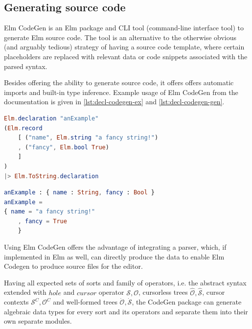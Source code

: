 \documentclass[sigplan,review]{acmart}
\begin{document}
\subsection{Generating source code}
Elm CodeGen\cite{elm-codegen-package} is an Elm package and
CLI tool (command-line interface tool) to generate Elm source code.
The tool is an alternative to the otherwise obvious (and arguably tedious)
strategy of having a source code template, where certain placeholders are
replaced with relevant data or code snippets associated with the parsed syntax.

Besides offering the ability to generate source code, it offers offers automatic
imports and built-in type inference. Example usage of Elm CodeGen from
the documentation\cite{elm-codegen-package} is given in \cref{lst:decl-codegen-ex} and \cref{lst:decl-codegen-gen}.

\begin{lstlisting}[language=elm,caption={An Elm CodeGen declaration passed to the ToString function},label={lst:decl-codegen-ex}]
Elm.declaration "anExample"
(Elm.record
    [ ("name", Elm.string "a fancy string!")
    , ("fancy", Elm.bool True)
    ]
)
|> Elm.ToString.declaration
\end{lstlisting}

\begin{lstlisting}[language=elm,caption={Result after running code generation via the Elm-CodeGen CLI},label={lst:decl-codegen-gen}]
anExample : { name : String, fancy : Bool }
anExample =
{ name = "a fancy string!"
    , fancy = True
    }
\end{lstlisting}

Using Elm CodeGen offers the advantage of integrating a parser, which,
if implemented in Elm as well, can directly produce the data to enable
Elm Codegen to produce source files for the editor.

Having all expected sets of sorts and family of operators,
i.e. the abstract syntax extended with $hole$ and $cursor$ operator $\mathcal{S},
  \mathcal{O}$, cursorless trees $\hat{\mathcal{O}},\hat{\mathcal{S}}$,
cursor contexts $\mathcal{S}^C,\mathcal{O}^C$ and
well-formed trees $\dot{\mathcal{O}},\dot{\mathcal{S}}$,
the CodeGen package can generate algebraic data types for every sort and its operators
and separate them into their own separate modules.
\end{document}
